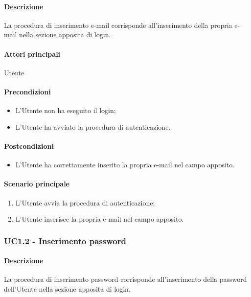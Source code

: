\paragraph*{Descrizione}
La procedura di inserimento e-mail corrisponde all’inserimento della propria e-mail nella sezione apposita di login.

\paragraph*{Attori principali}
Utente

\paragraph*{Precondizioni}
\begin{itemize}
  \item L’Utente non ha eseguito il login;
  \item L’Utente ha avviato la procedura di autenticazione.  
\end{itemize}

\paragraph*{Postcondizioni}
\begin{itemize}
  \item L’Utente ha correttamente inserito la propria e-mail nel campo apposito.
\end{itemize}

\paragraph*{Scenario principale}
\begin{enumerate}
  \item L’Utente avvia la procedura di autenticazione;
  \item L’Utente inserisce la propria e-mail nel campo apposito.  
\end{enumerate}


\subsubsection{UC1.2 - Inserimento password}\label{UC1point2}
\paragraph*{Descrizione}
La procedura di inserimento password corrisponde all’inserimento della password dell'Utente nella sezione apposita di login.

